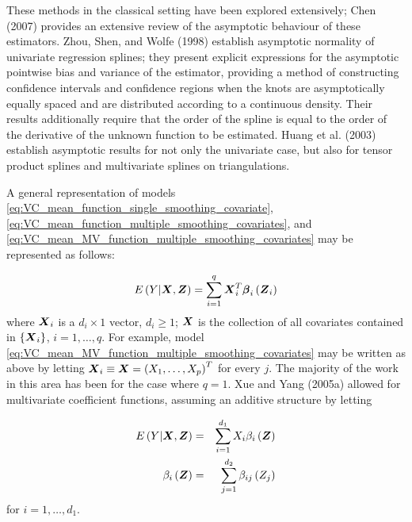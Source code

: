 \documentclass[12pt]{article}
\newcommand{\bfbeta}{\mbox{\boldmath $\beta$}}
\newcommand{\bfX}{\mbox{\boldmath $X$}}
\newcommand{\bfZ}{\mbox{\boldmath $Z$}}
\begin{document}
These methods in the classical setting have been explored extensively; Chen (2007) provides an extensive review of the asymptotic behaviour of these estimators. Zhou, Shen, and Wolfe (1998) establish asymptotic normality of univariate regression splines; they present explicit expressions for the asymptotic pointwise bias and variance of the estimator, providing a method of constructing confidence intervals and confidence regions when the knots are asymptotically equally spaced and are distributed according to a continuous density. Their results additionally require that the order of the spline is equal to the order of the derivative of the unknown function to be estimated. Huang et al. (2003) establish asymptotic results for not only the univariate case, but also for tensor product splines and multivariate splines on triangulations.  

A general representation of models \ref{eq:VC_mean_function_single_smoothing_covariate}, \ref{eq:VC_mean_function_multiple_smoothing_covariates}, and \ref{eq:VC_mean_MV_function_multiple_smoothing_covariates} may be represented as follows:

\begin{equation} \label{eq:general_VC_model}
E\left(Y \vert \bfX, \bfZ\right) = \sum_{i=1}^q \bfX_i^T \bfbeta_i\left(\bfZ_i\right)
\end{equation}
\noindent
where $\bfX_i$ is a $d_i \times 1$ vector, $d_i \ge 1$; $\bfX$ is the collection of all covariates contained in $\lbrace \bfX_i \rbrace$, $i=1,\dots,q$. For example, model \ref{eq:VC_mean_MV_function_multiple_smoothing_covariates} may be written as above by letting $\bfX_i \equiv \bfX = \left(X_1,\dots, X_p\right)^T$ for every $j$. The majority of the work in this area has been for the case where $q=1$.  Xue and Yang (2005a) allowed for multivariate coefficient functions, assuming an additive structure by letting

\begin{eqnarray} 
E\left(Y \vert \bfX, \bfZ\right) &=& \sum_{i=1}^{d_1} X_i \beta_i\left(\bfZ\right) \label{eq:xue_VC_model}\\
\beta_i\left(\bfZ\right) &=& \sum_{j=1}^{d_2} \beta_{ij}\left(Z_j\right) \nonumber
\end{eqnarray}
\noindent
for $i=1,\dots, d_1$.

 
\end{document}
